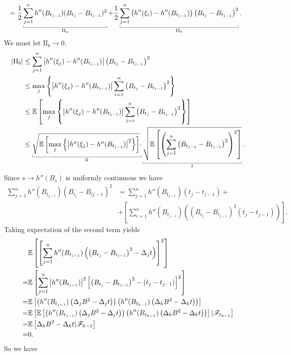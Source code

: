\documentclass[12pt]{report}
\begin{document}
\begin{fancyproof}
\begin{enumerate}
\begin{align*}
		&=\unmezz\ubracketthin{\sum_{j=1}^{n}h''(B_{t_{j-1}})(B_{t_{j}}-B_{t_{j-1}})^{2}}_{\mathrm{II}_{a}}+\unmezz\ubracketthin{\sum_{j=1}^{n}\left(h''(\xi_{i})-h''(B_{t_{j-1}})\right)\left(B_{t_{j}}-B_{t_{j-1}}\right)^{2}}_{\mathrm{II}_{b}}.
	\end{align*}
	We must let $\mathrm{II}_{b}\to0$.
	\begin{align*}
		|\mathrm{II}_{b}|&\leq\sum_{j=1}^{n}\left|h''(\xi_{j})-h''(B_{t_{j-1}})\right|\left(B_{t_{j}}-B_{t_{j-1}}\right)^{2}\\
		&\leq\max_{j}\left\{\left|h''(\xi_{j})-h''(B_{t_{j-1}})\right|\sum_{i=1}^{n}\left(B_{t_{j}}-B_{t_{j-1}}\right)^{2}\right\}\\
		&\leq\ev{\max_{j}\left\{\left|h''(\xi_{j})-h''(B_{t_{j-1}})\right|\sum_{j=i}^{n}\left(B_{t_{j}}-B_{t_{j-1}}\right)^{2}\right\}}\\
		&\leq\ubracketthin{\sqrt{\ev{\max_{j}\left\{\left|h''(\xi_{j})-h''(B_{t_{j-1}})\right|^{2}\right\}}}\cdot}_{0}\ubracketthin{\sqrt{\ev{\left(\sum_{j=1}^{n}\left(B_{t_{j-1}}-B_{t_{j-1}}\right)^{2}\right)^{2}}}}_{t}.
	\end{align*}
	Since $s\to h''(B_{s})$ is uniformly continuous we have
	\begin{align*}
		\sum_{j=1}^{n}h''(B_{t_{j-1}})(B_{t_{j}}-B_{tj-1})^{2}&=\sum_{j=1}^{n}h''(B_{t_{j-1}})(t_{j}-t_{j-1})+\\
		&+\left[\sum_{i=1}^{n}h''(B_{t_{j-1}})\left((B_{t_{j}}-B_{t_{j-1}})^{2}(t_{j}-t_{j-1})\right)\right].
	\end{align*}
	Taking expectation of the second term yields
	\begin{align*}
		&\mathbb{E}\left[\left[\sum_{j=1}^{n}h''(B_{t_{j-1}})\left(\left(B_{t_{j}}-B_{t_{j-1}}\right)^{2}-\Delta_{j}t\right)\right]^{2}\right]\\
		=&\mathbb{E}\left[\sum_{j=1}^{n}\left|h''(B_{t_{j-1}})\right|^{2}\left[\left(B_{t_{j}}-B_{t_{j-1}}\right)^{2}-(t_{j}-t_{j-1})\right]^{2}\right]\\
		=&\mathbb{E}\left[\left(h''(B_{t_{j-1}})\left(\Delta_{j}B^{2}-\Delta_{j}t\right)\right)\left(h''(B_{t_{k-1}})\left(\Delta_{k}B^{2}-\Delta_{k}t\right)\right)\right]\\
		=&\mathbb{E}\left[\mathbb{E}\left[\left(h''(B_{t_{j-1}})\left(\Delta_{j}B^{2}-\Delta_{j}t\right)\right)\left(h''(B_{t_{k-1}})\left(\Delta_{k}B^{2}-\Delta_{k}t\right)\right)\right]|\mathscr{F}_{t_{k-1}}\right]\\
		=&\mathbb{E}\left[\Delta_{k}B^{2}-\Delta_{k}t|\mathscr{F}_{k-1}\right]\\
		=&0.
	\end{align*}
	So we have
	\begin{align*}

\end{align*}
\end{enumerate}
\end{fancyproof}
\end{document}
